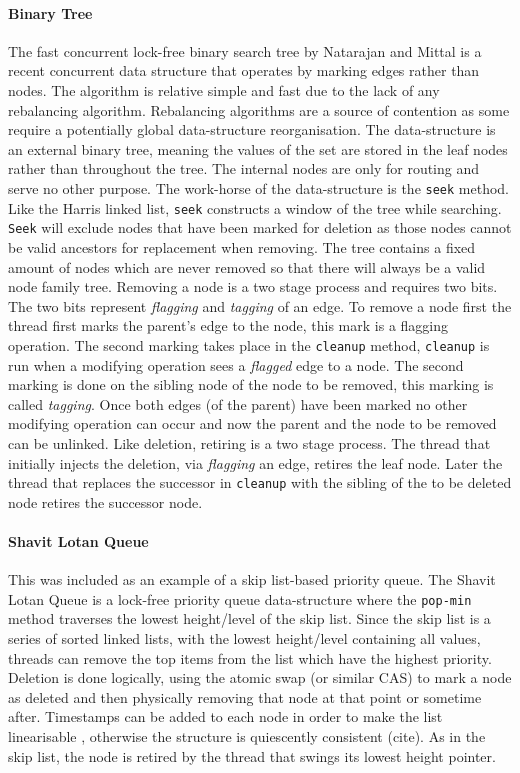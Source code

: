 \paragraph{Binary Tree} The fast concurrent lock-free binary search tree by Natarajan and Mittal is a recent concurrent data structure that operates by marking edges rather than nodes. \cite{LFBinaryTree} The algorithm is relative simple and fast due to the lack of any rebalancing algorithm. Rebalancing algorithms are a source of contention as some require a potentially global data-structure reorganisation. The data-structure is an external binary tree, meaning the values of the set are stored in the leaf nodes rather than throughout the tree. The internal nodes are only for routing and serve no other purpose. The work-horse of the data-structure is the \texttt{seek} method. Like the Harris linked list, \texttt{seek} constructs a window of the tree while searching. \texttt{Seek} will exclude nodes that have been marked for deletion as those nodes cannot be valid ancestors for replacement when removing. The tree contains a fixed amount of nodes which are never removed so that there will always be a valid node family tree. Removing a node is a two stage process and requires two bits. The two bits represent \textit{flagging} and \textit{tagging} of an edge. To remove a node first the thread first marks the parent's edge to the node, this mark is a flagging operation. The second marking takes place in the \texttt{cleanup} method, \texttt{cleanup} is run when a modifying operation sees a \textit{flagged} edge to a node. The second marking is done on the sibling node of the node to be removed, this marking is called \textit{tagging}. Once both edges (of the parent) have been marked no other modifying operation can occur and now the parent and the node to be removed can be unlinked. Like deletion, retiring is a two stage process. The thread that initially injects the deletion, via \textit{flagging} an edge, retires the leaf node. Later the thread that replaces the successor in \texttt{cleanup} with the sibling of the to be deleted node retires the successor node.


\paragraph{Shavit Lotan Queue} This was included as an example of a skip list-based priority queue. \cite{ShavitLotanQueue} The Shavit Lotan Queue is a lock-free priority queue data-structure where the \texttt{pop-min} method traverses the lowest height/level of the skip list. Since the skip list is a series of sorted linked lists, with the lowest height/level containing all values, threads can remove the top items from the list which have the highest priority. Deletion is done logically, using the atomic swap (or similar CAS) to mark a node as deleted and then physically removing that node at that point or sometime after. Timestamps can be added to each node in order to make the list linearisable \cite{Linearizability}, otherwise the structure is quiescently consistent (cite). As in the skip list, the node is retired by the thread that swings its lowest height pointer.


